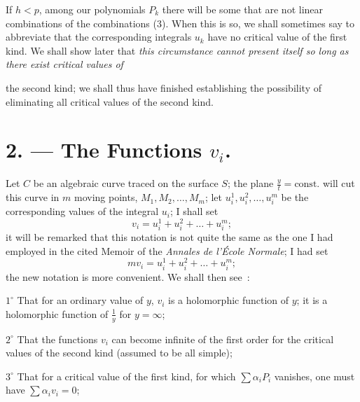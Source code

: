 \documentclass{article}
\begin{document}
If $h < p$, among our polynomials $P_{k}$ there will be some that are not linear combinations of the combinations (3). When this is so, we shall sometimes say to abbreviate that the corresponding integrals $u_{k}$ have no critical value of the first kind. We shall show later that \emph{this circumstance cannot present itself so long as there exist critical values of}

the second kind; we shall thus have finished establishing the possibility of eliminating all critical values of the second kind.

\section*{2. --- The Functions $v_{i}$.}

Let $C$ be an algebraic curve traced on the surface $S$; the plane $\frac{y}{t} = \text{const.}$ will cut this curve in $m$ moving points, $M_{1}, M_{2}, \ldots, M_{m}$; let $u_{i}^{1}, u_{i}^{2}, \ldots, u_{i}^{m}$ be the corresponding values of the integral $u_{i}$; I shall set
\[
v_{i} = u_{i}^{1} + u_{i}^{2} + \ldots + u_{i}^{m}; \tag{1}
\]
it will be remarked that this notation is not quite the same as the one I had employed in the cited Memoir of the \emph{Annales de l'École Normale}; I had set
\[
m v_{i} = u_{i}^{1} + u_{i}^{2} + \ldots + u_{i}^{m};
\]
the new notation is more convenient. We shall then see~:

$1^{\circ}$ That for an ordinary value of $y$, $v_{i}$ is a holomorphic function of $y$; it is a holomorphic function of $\frac{1}{y}$ for $y = \infty$;

$2^{\circ}$ That the functions $v_{i}$ can become infinite of the first order for the critical values of the second kind (assumed to be all simple);

$3^{\circ}$ That for a critical value of the first kind, for which $\displaystyle\sum \alpha_{i} P_{i}$ vanishes, one must have $\displaystyle\sum \alpha_{i} v_{i} = 0$;
\end{document}

